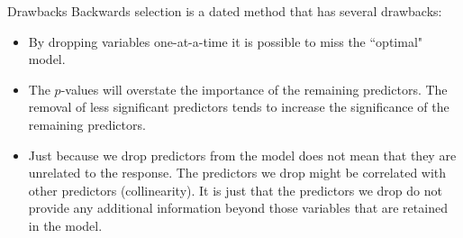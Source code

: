 \documentclass[10pt]{beamer}\usepackage[]{graphicx}\usepackage[]{color}
\begin{document}
% 
%  

\begin{frame}{Drawbacks}
Backwards selection is a dated method that has several drawbacks:
\vspace{5pt}
\begin{itemize}
\item By dropping variables one-at-a-time it is possible to miss the ``optimal" model.
\vspace{5pt}
\item The $p$-values will overstate the importance of the remaining predictors.  The removal of less significant predictors tends to increase the significance of the remaining predictors. 
\vspace{5pt}
\item Just because we drop predictors from the model does not mean that they are unrelated to the response.  The predictors we drop might be correlated with other predictors (collinearity).  It is just that the predictors we drop do not provide any additional information beyond those variables that are retained in the model.
\end{itemize}
\end{frame}
\end{document}
